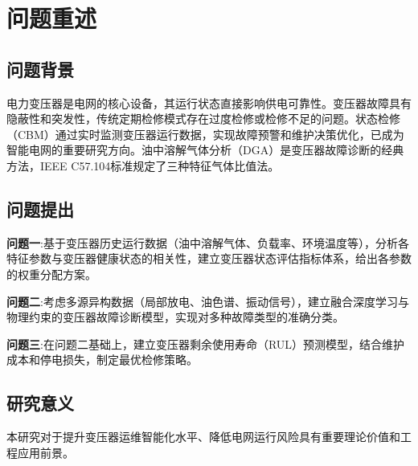 \newpage
\section{问题重述}

\subsection{问题背景}
电力变压器是电网的核心设备，其运行状态直接影响供电可靠性。变压器故障具有隐蔽性和突发性，传统定期检修模式存在过度检修或检修不足的问题。状态检修（CBM）通过实时监测变压器运行数据，实现故障预警和维护决策优化，已成为智能电网的重要研究方向。油中溶解气体分析（DGA）是变压器故障诊断的经典方法，IEEE C57.104标准规定了三种特征气体比值法。

\subsection{问题提出}
\textbf{问题一}:基于变压器历史运行数据（油中溶解气体、负载率、环境温度等），分析各特征参数与变压器健康状态的相关性，建立变压器状态评估指标体系，给出各参数的权重分配方案。

\textbf{问题二}:考虑多源异构数据（局部放电、油色谱、振动信号），建立融合深度学习与物理约束的变压器故障诊断模型，实现对多种故障类型的准确分类。

\textbf{问题三}:在问题二基础上，建立变压器剩余使用寿命（RUL）预测模型，结合维护成本和停电损失，制定最优检修策略。

\subsection{研究意义}
本研究对于提升变压器运维智能化水平、降低电网运行风险具有重要理论价值和工程应用前景。